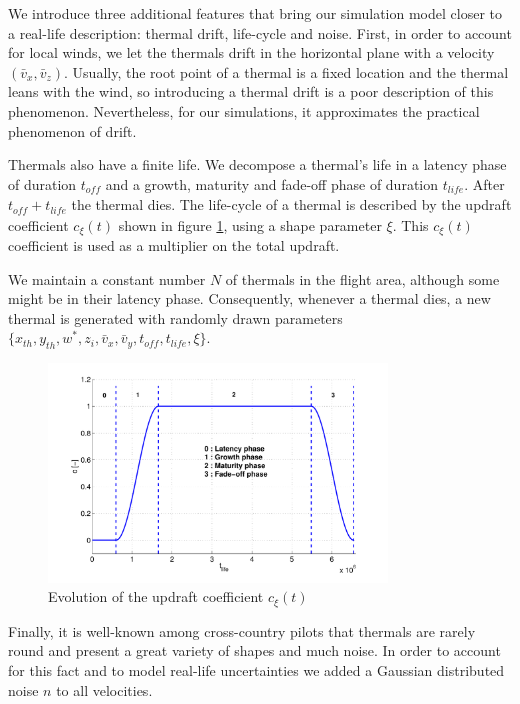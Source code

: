 \documentclass{ifacconf}
\begin{document}
We introduce three additional features that bring our simulation model closer to a real-life description: thermal drift, life-cycle and noise. First, in order to account for local winds, we let the thermals drift in the horizontal plane with a velocity $(\bar{v}_x, \bar{v}_z)$. Usually, the root point of a thermal is a fixed location and the thermal leans with the wind, so introducing a thermal drift is a poor description of this phenomenon. Nevertheless, for our simulations, it approximates the practical phenomenon of drift.

Thermals also have a finite life. We decompose a thermal's life in a latency phase of duration $t_{\textit{off}}$ and a growth, maturity and fade-off phase of duration $t_{\textit{life}}$. After $t_{\textit{off}}+t_{\textit{life}}$ the thermal dies. The life-cycle of a thermal is described by the updraft coefficient $c_\xi(t)$ shown in figure \ref{fig:life_cycle}, using a shape parameter $\xi$. This $c_\xi(t)$ coefficient is used as a multiplier on the total updraft.

We maintain a constant number $N$ of thermals in the flight area, although some might be in their latency phase. Consequently, whenever a thermal dies, a new thermal is generated with randomly drawn parameters $\{x_{th},y_{th}, w^*, z_i, \bar{v}_x, \bar{v}_y, t_{\textit{off}}, t_{\textit{life}}, \xi \}$.

\begin{figure}%
\begin{center}
 \includegraphics[width=9cm]{img/lifeCycle.pdf}
\end{center}
\caption{Evolution of the updraft coefficient $c_\xi(t)$}
\label{fig:life_cycle}
\end{figure}

Finally, it is well-known among cross-country pilots that thermals are rarely round and present a great variety of shapes and much noise. In order to account for this fact and to model real-life uncertainties we added a Gaussian distributed noise $n$ to all velocities.
\end{document}
